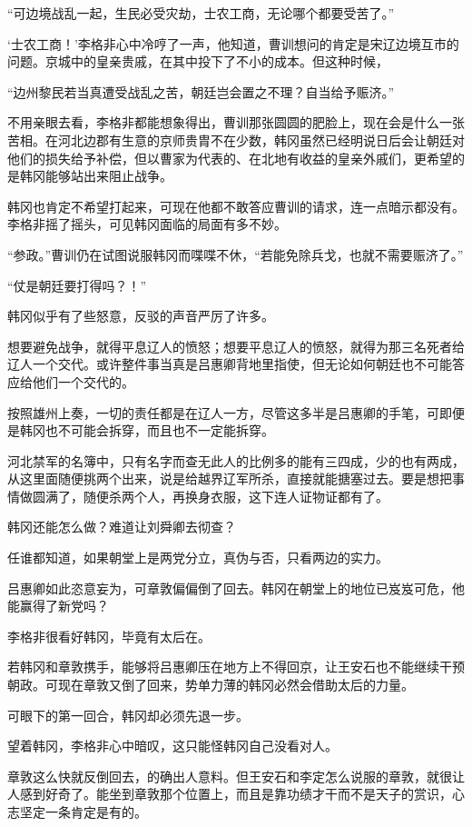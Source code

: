“可边境战乱一起，生民必受灾劫，士农工商，无论哪个都要受苦了。”

‘士农工商！’李格非心中冷哼了一声，他知道，曹训想问的肯定是宋辽边境互市的问题。京城中的皇亲贵戚，在其中投下了不小的成本。但这种时候，

“边州黎民若当真遭受战乱之苦，朝廷岂会置之不理？自当给予赈济。”

不用亲眼去看，李格非都能想象得出，曹训那张圆圆的肥脸上，现在会是什么一张苦相。在河北边郡有生意的京师贵胄不在少数，韩冈虽然已经明说日后会让朝廷对他们的损失给予补偿，但以曹家为代表的、在北地有收益的皇亲外戚们，更希望的是韩冈能够站出来阻止战争。

韩冈也肯定不希望打起来，可现在他都不敢答应曹训的请求，连一点暗示都没有。李格非摇了摇头，可见韩冈面临的局面有多不妙。

“参政。”曹训仍在试图说服韩冈而喋喋不休，“若能免除兵戈，也就不需要赈济了。”

“仗是朝廷要打得吗？！”

韩冈似乎有了些怒意，反驳的声音严厉了许多。

想要避免战争，就得平息辽人的愤怒；想要平息辽人的愤怒，就得为那三名死者给辽人一个交代。或许整件事当真是吕惠卿背地里指使，但无论如何朝廷也不可能答应给他们一个交代的。

按照雄州上奏，一切的责任都是在辽人一方，尽管这多半是吕惠卿的手笔，可即便是韩冈也不可能会拆穿，而且也不一定能拆穿。

河北禁军的名簿中，只有名字而查无此人的比例多的能有三四成，少的也有两成，从这里面随便挑两个出来，说是给越界辽军所杀，直接就能搪塞过去。要是想把事情做圆满了，随便杀两个人，再换身衣服，这下连人证物证都有了。

韩冈还能怎么做？难道让刘舜卿去彻查？

任谁都知道，如果朝堂上是两党分立，真伪与否，只看两边的实力。

吕惠卿如此恣意妄为，可章敦偏偏倒了回去。韩冈在朝堂上的地位已岌岌可危，他能赢得了新党吗？

李格非很看好韩冈，毕竟有太后在。

若韩冈和章敦携手，能够将吕惠卿压在地方上不得回京，让王安石也不能继续干预朝政。可现在章敦又倒了回来，势单力薄的韩冈必然会借助太后的力量。

可眼下的第一回合，韩冈却必须先退一步。

望着韩冈，李格非心中暗叹，这只能怪韩冈自己没看对人。

章敦这么快就反倒回去，的确出人意料。但王安石和李定怎么说服的章敦，就很让人感到好奇了。能坐到章敦那个位置上，而且是靠功绩才干而不是天子的赏识，心志坚定一条肯定是有的。

